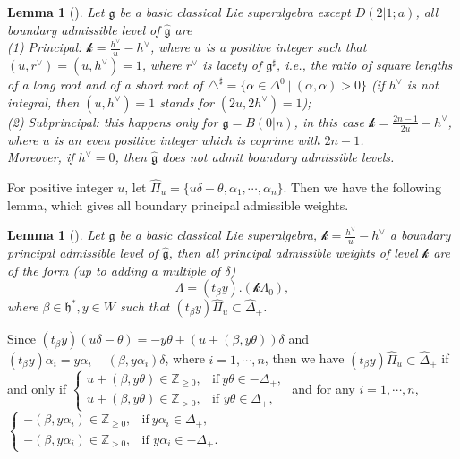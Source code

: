 \documentclass[12pt]{article}
\newtheorem{lem}[thm]{Lemma}
\begin{document}
\begin{lem}[\cite{GK25}]\label{boundary}
Let $\mathfrak{g}$ be a basic classical Lie superalgebra
except $D(2|1;a)$, all boundary admissible level of $\widehat{\mathfrak{g}}$ are\\
(1) Principal: $\mathcal{k}=\frac{h^{\vee}}{u}-h^{\vee}$, where $u$ is a positive integer such that $(u,r^\vee)=(u,h^\vee)=1$,
where $r^\vee$ is lacety of $\mathfrak{g}^\sharp$,
i.e., the ratio of square lengths of a long root and of a short root of $\triangle^\sharp=\{\alpha\in\Delta^0~|~(\alpha,\alpha)>0\}$ (if $h^\vee$ is not integral, then $(u,h^\vee)=1$ stands for $(2u,2h^\vee)=1$);\\
(2) Subprincipal: this happens only for $\mathfrak{g}=B(0|n)$, in this case $\mathcal{k}=\frac{2n-1}{2u}-h^{\vee}$,
where $u$ is an even positive integer which is coprime with $2n-1$.\\
Moreover, if $h^\vee=0$, then $\widehat{\mathfrak{g}}$ does not admit boundary admissible levels.
\end{lem}
For positive integer $u$, let $\widehat{\Pi}_u=\{u\delta-\theta,\alpha_1,\cdots,\alpha_n\}$.
Then we have the following lemma, which gives all boundary principal admissible weights.
\begin{lem}[\cite{KW89,KW14}]\label{lemboundary}
Let $\mathfrak{g}$ be a basic classical Lie superalgebra, $\mathcal{k}=\frac{h^{\vee}}{u}-h^{\vee}$ a boundary principal admissible level of $\widehat{\mathfrak{g}}$,
then all principal admissible weights of level $\mathcal{k}$ are of the form (up to adding a multiple of $\delta$)
$$\Lambda=(t_\beta y).(\mathcal{k}\Lambda_0),$$
where $\beta\in \mathfrak{h}^*, y\in W$ such that $(t_\beta y)\widehat{\Pi}_u\subset\widehat{\Delta}_+$.
\end{lem}
Since $(t_\beta y)(u\delta-\theta)=-y\theta+(u+(\beta,y\theta))\delta$ and
$(t_\beta y)\alpha_i=y\alpha_i-(\beta,y\alpha_i)\delta$, where $i=1,\cdots,n$,
then we have $(t_\beta y)\widehat{\Pi}_u\subset\widehat{\Delta}_+$ if and only if
$\begin{cases}
   u+(\beta,y\theta)\in\mathbb{Z}_{\geq0}, & \text{if}~ y\theta\in -\Delta_+,\\
   u+(\beta,y\theta)\in\mathbb{Z}_{>0},  & \text{if } y\theta\in \Delta_+,
\end{cases}$
and for any $i=1,\cdots,n$,
$\begin{cases}
  -(\beta,y\alpha_i)\in\mathbb{Z}_{\geq0}, & \text{if}~ y\alpha_i\in \Delta_+,\\
  -(\beta,y\alpha_i)\in\mathbb{Z}_{>0},  & \text{if } y\alpha_i\in -\Delta_+.
\end{cases}$
\end{document}
